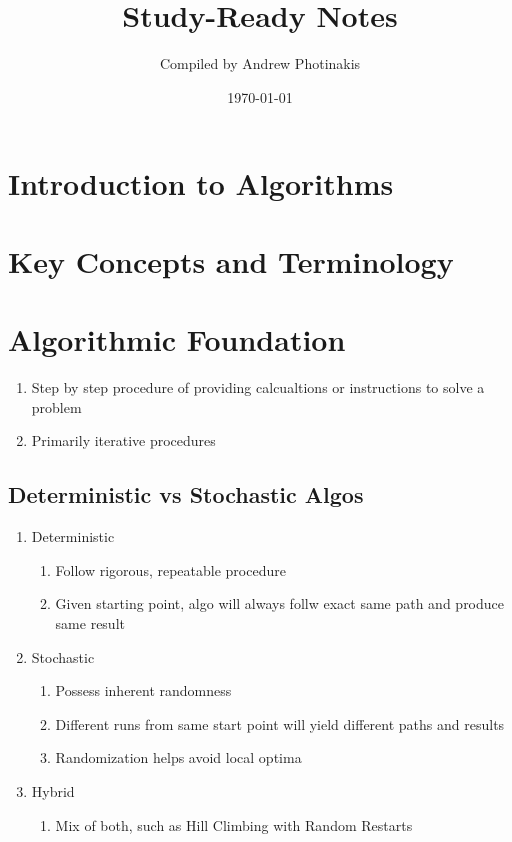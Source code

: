 \documentclass[12pt]{article}
\title{\TOPICTITLE\\\large Study-Ready Notes}
\author{Compiled by Andrew Photinakis}
\date{\today}
\begin{document}
\maketitle
\tableofcontents
\newpage

\section*{Introduction to Algorithms}

\section{Key Concepts and Terminology}

\section{Algorithmic Foundation}

\begin{enumerate}
    \item Step by step procedure of providing calcualtions or instructions to solve a problem
    \item Primarily iterative procedures
\end{enumerate}

\subsection{Deterministic vs Stochastic Algos}
\begin{enumerate}
    \item Deterministic
          \begin{enumerate}
              \item Follow rigorous, repeatable procedure
              \item Given starting point, algo will always follw exact same path and produce same result
          \end{enumerate}
    \item Stochastic
          \begin{enumerate}
              \item Possess inherent randomness
              \item Different runs from same start point will yield different paths and results
              \item Randomization helps avoid local optima
          \end{enumerate}
    \item Hybrid
          \begin{enumerate}
              \item Mix of both, such as Hill Climbing with Random Restarts
          \end{enumerate}
\end{enumerate}
\end{document}
